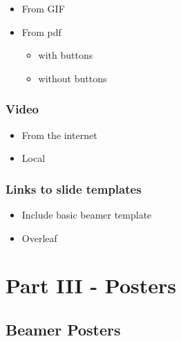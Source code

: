 \documentclass[
]{book}
\providecommand{\tightlist}{%
  \setlength{\itemsep}{0pt}\setlength{\parskip}{0pt}}
\begin{document}
\begin{itemize}
\tightlist
\item
  From GIF
\item
  From pdf

  \begin{itemize}
  \tightlist
  \item
    with buttons
  \item
    without buttons
  \end{itemize}
\end{itemize}

\hypertarget{video}{%
\section{Video}\label{video}}

\begin{itemize}
\tightlist
\item
  From the internet
\item
  Local
\end{itemize}

\hypertarget{links-to-slide-templates}{%
\section{Links to slide templates}\label{links-to-slide-templates}}

\begin{itemize}
\tightlist
\item
  Include basic beamer template
\item
  Overleaf
\end{itemize}

\hypertarget{part-part-iii---posters}{%
\part{Part III - Posters}\label{part-part-iii---posters}}

\hypertarget{beamer-posters}{%
\chapter{Beamer Posters}\label{beamer-posters}}
\end{document}
